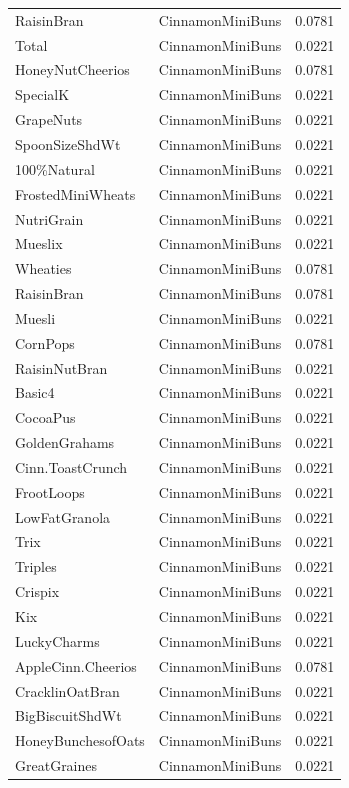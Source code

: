\begin{table}[!htbp]
\begin{tabular}{lll}
\\
RaisinBran & CinnamonMiniBuns & 0.0781
\\
Total & CinnamonMiniBuns & 0.0221
\\
HoneyNutCheerios & CinnamonMiniBuns & 0.0781
\\
SpecialK & CinnamonMiniBuns & 0.0221
\\
GrapeNuts & CinnamonMiniBuns & 0.0221
\\
SpoonSizeShdWt & CinnamonMiniBuns & 0.0221
\\
100\%Natural & CinnamonMiniBuns & 0.0221
\\
FrostedMiniWheats & CinnamonMiniBuns & 0.0221
\\
NutriGrain & CinnamonMiniBuns & 0.0221
\\
Mueslix & CinnamonMiniBuns & 0.0221
\\
Wheaties & CinnamonMiniBuns & 0.0781
\\
RaisinBran & CinnamonMiniBuns & 0.0781
\\
Muesli & CinnamonMiniBuns & 0.0221
\\
CornPops & CinnamonMiniBuns & 0.0781
\\
RaisinNutBran & CinnamonMiniBuns & 0.0221
\\
Basic4 & CinnamonMiniBuns & 0.0221
\\
CocoaPus & CinnamonMiniBuns & 0.0221
\\
GoldenGrahams & CinnamonMiniBuns & 0.0221
\\
Cinn.ToastCrunch & CinnamonMiniBuns & 0.0221
\\
FrootLoops & CinnamonMiniBuns & 0.0221
\\
LowFatGranola & CinnamonMiniBuns & 0.0221
\\
Trix & CinnamonMiniBuns & 0.0221
\\
Triples & CinnamonMiniBuns & 0.0221
\\
Crispix & CinnamonMiniBuns & 0.0221
\\
Kix & CinnamonMiniBuns & 0.0221
\\
LuckyCharms & CinnamonMiniBuns & 0.0221
\\
AppleCinn.Cheerios & CinnamonMiniBuns & 0.0781
\\
CracklinOatBran & CinnamonMiniBuns & 0.0221
\\
BigBiscuitShdWt & CinnamonMiniBuns & 0.0221
\\
HoneyBunchesofOats & CinnamonMiniBuns & 0.0221
\\
GreatGraines & CinnamonMiniBuns & 0.0221
\\

\end{tabular}
\end{table}
